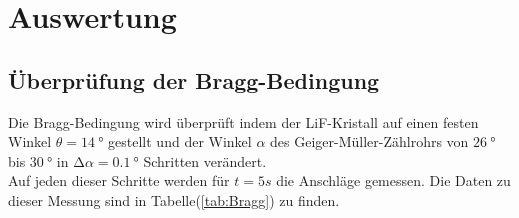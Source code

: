 \newpage
\section{Auswertung}

    \subsection{Überprüfung der Bragg-Bedingung}

        \noindent Die Bragg-Bedingung wird überprüft indem der LiF-Kristall auf einen festen Winkel $\theta = \SI{14}{\degree}$ gestellt und der Winkel
        $\alpha$ des Geiger-Müller-Zählrohrs von $\SI{26}{\degree}$ bis $\SI{30}{\degree}$ in $\increment \alpha = \SI{0.1}{\degree}$ Schritten 
        verändert.\\ Auf jeden dieser Schritte werden für $t = 5s$ die Anschläge gemessen. Die Daten zu dieser Messung sind in Tabelle(\ref{tab:Bragg}) 
        zu finden.

